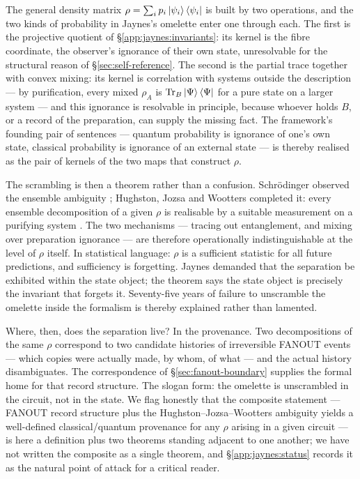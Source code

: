 The general density matrix
$\rho = \sum_i p_i \ket{\psi_i}\bra{\psi_i}$ is built by two
operations, and the two kinds of probability in Jaynes's omelette
enter one through each. The first is the projective quotient of
\S\ref{app:jaynes:invariants}: its kernel is the fibre coordinate, the
observer's ignorance of their own state, unresolvable for the
structural reason of \S\ref{sec:self-reference}. The second is the
partial trace together with convex mixing: its kernel is correlation
with systems outside the description --- by purification, every mixed
$\rho_A$ is $\mathrm{Tr}_B\ket{\Psi}\bra{\Psi}$ for a pure state on a
larger system --- and this ignorance is resolvable in principle,
because whoever holds $B$, or a record of the preparation, can supply
the missing fact. The framework's founding pair of sentences ---
quantum probability is ignorance of one's own state, classical
probability is ignorance of an external state --- is thereby realised
as the pair of kernels of the two maps that construct $\rho$.

The scrambling is then a theorem rather than a confusion. Schr\"odinger
observed the ensemble ambiguity \autocite{schrodinger1936probability};
Hughston, Jozsa and Wootters completed it: every ensemble
decomposition of a given $\rho$ is realisable by a suitable
measurement on a purifying system \autocite{hughston1993ensemble}.
The two mechanisms --- tracing out entanglement, and mixing over
preparation ignorance --- are therefore operationally
indistinguishable at the level of $\rho$ itself. In statistical
language: $\rho$ is a sufficient statistic for all future predictions,
and sufficiency is forgetting. Jaynes demanded that the separation be
exhibited within the state object; the theorem says the state object
is precisely the invariant that forgets it. Seventy-five years of
failure to unscramble the omelette inside the formalism is thereby
explained rather than lamented.

Where, then, does the separation live? In the provenance. Two
decompositions of the same $\rho$ correspond to two candidate
histories of irreversible FANOUT events --- which copies were actually
made, by whom, of what --- and the actual history disambiguates. The
correspondence of \S\ref{sec:fanout-boundary} supplies the formal home for that
record structure. The slogan form: the omelette is unscrambled in the
circuit, not in the state. We flag honestly that the composite
statement --- FANOUT record structure plus the
Hughston--Jozsa--Wootters ambiguity yields a well-defined
classical/quantum provenance for any $\rho$ arising in a given circuit
--- is here a definition plus two theorems standing adjacent to one
another; we have not written the composite as a single theorem, and
\S\ref{app:jaynes:status} records it as the natural point of attack
for a critical reader.

